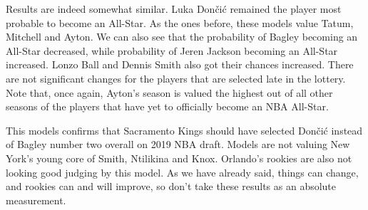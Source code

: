 \documentclass[a4paper]{article}
\begin{document}
Results are indeed somewhat similar. Luka Dončić remained the player most probable to become an All-Star. As the ones before, these models value Tatum, Mitchell and Ayton. We can also see that the probability of Bagley becoming an All-Star decreased, while probability of Jeren Jackson becoming an All-Star increased. Lonzo Ball and Dennis Smith  also got their chances increased. There are not significant changes for the players that are selected late in the lottery. Note that, once again, Ayton's season is valued the highest out of all other seasons of the players that have yet to officially become an NBA All-Star.

This models confirms that Sacramento Kings should have selected Dončić instead of Bagley number two overall on 2019 NBA draft. Models are not valuing New York's young core of Smith, Ntilikina and Knox. Orlando's rookies are also not looking good judging by this model. As we have already said, things can change, and rookies can and will improve, so don't take these results as an absolute measurement.

\pagebreak

\appendix


\appendix
\end{document}
